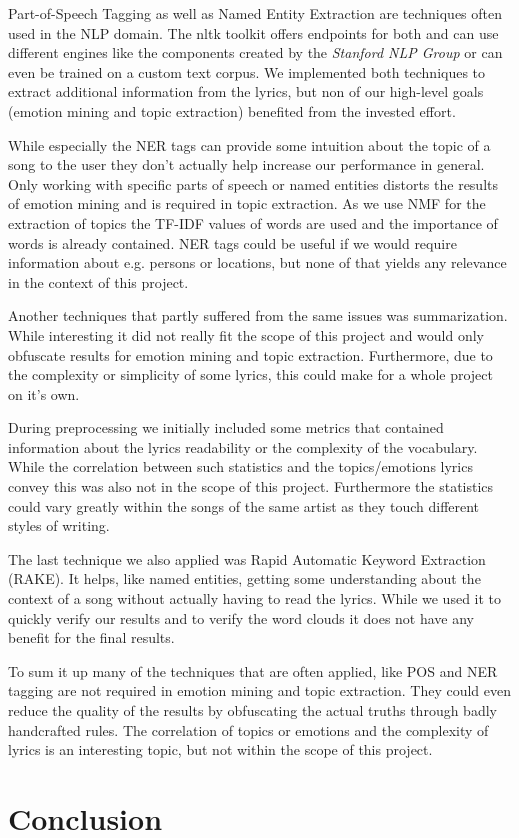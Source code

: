 \documentclass[10pt,a4paper]{article}
\begin{document}
	Part-of-Speech Tagging as well as Named Entity Extraction are techniques often used in the NLP domain. The nltk toolkit offers endpoints for both and can use different engines like the components created by the \textit{Stanford NLP Group} or can even be trained on a custom text corpus. We implemented both techniques to extract additional information from the lyrics, but non of our high-level goals (emotion mining and topic extraction) benefited from the invested effort. 
	
	While especially the NER tags can provide some intuition about the topic of a song to the user they don't actually help increase our performance in general. Only working with specific parts of speech or named entities distorts the results of emotion mining and is required in topic extraction. As we use NMF for the extraction of topics the TF-IDF values of words are used and the importance of words is already contained. NER tags could be useful if we would require information about e.g. persons or locations, but none of that yields any relevance in the context of this project.
	
	Another techniques that partly suffered from the same issues was summarization. While interesting it did not really fit the scope of this project and would only obfuscate results for emotion mining and topic extraction. Furthermore, due to the complexity or simplicity of some lyrics, this could make for a whole project on it's own.
	
	During preprocessing we initially included some metrics that contained information about the lyrics readability or the complexity of the vocabulary. While the correlation between such statistics and the topics/emotions lyrics convey this was also not in the scope of this project. Furthermore the statistics could vary greatly within the songs of the same artist as they touch different styles of writing.
	
	The last technique we also applied was Rapid Automatic Keyword Extraction (RAKE). It helps, like named entities, getting some understanding about the context of a song without actually having to read the lyrics. While we used it to quickly verify our results and to verify the word clouds it does not have any benefit for the final results.
	
	To sum it up many of the techniques that are often applied, like POS and NER tagging are not required in emotion mining and topic extraction. They could even reduce the quality of the results by obfuscating the actual truths through badly handcrafted rules. The correlation of topics or emotions and the complexity of lyrics is an interesting topic, but not within the scope of this project. 
	

	\section{Conclusion}
	\label{sec:conclusion}
	
	\newpage
	
	
	
	
\end{document}
